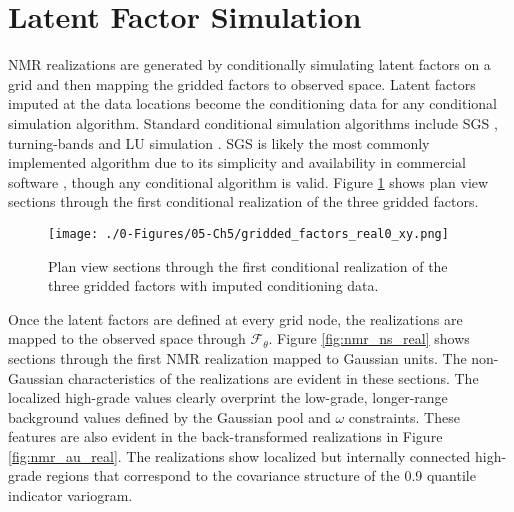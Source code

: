 \FloatBarrier
\section{Latent Factor Simulation}
\label{sec:latentsim}

\gls{NMR} realizations are generated by conditionally simulating latent factors on a grid and then mapping the gridded factors to observed space. Latent factors imputed at the data locations become the conditioning data for any conditional simulation algorithm. Standard conditional simulation algorithms include \gls{SGS} \citep{gomez-hernandez1993joint}, turning-bands \citep{journel1974geostatistics} and LU simulation \citep{davis1987production}. \gls{SGS} is likely the most commonly implemented algorithm due to its simplicity and availability in commercial software \citep{rossi2013mineral}, though any conditional algorithm is valid. Figure \ref{fig:gridded_factors_real0_xy} shows plan view sections through the first conditional realization of the three gridded factors.

\begin{figure}[htb!]
    \centering
    \texttt{[image: ./0-Figures/05-Ch5/gridded\_factors\_real0\_xy.png]}
    \caption{Plan view sections through the first conditional realization of the three gridded factors with imputed conditioning data.}
    \label{fig:gridded_factors_real0_xy}
\end{figure}

Once the latent factors are defined at every grid node, the realizations are mapped to the observed space through $\mathcal{F}_{\theta}$. Figure \ref{fig:nmr_ns_real} shows sections through the first \gls{NMR} realization mapped to Gaussian units. The non-Gaussian characteristics of the realizations are evident in these sections. The localized high-grade values clearly overprint the low-grade, longer-range background values defined by the Gaussian pool and $\omega$ constraints. These features are also evident in the back-transformed realizations in Figure \ref{fig:nmr_au_real}. The realizations show localized but internally connected high-grade regions that correspond to the covariance structure of the 0.9 quantile indicator variogram.


